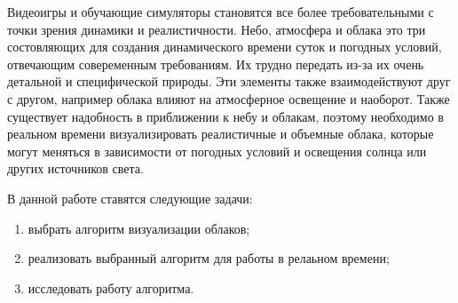 \Introduction

Видеоигры и обучающие симуляторы становятся все более требовательными с точки зрения динамики и реалистичности.
Небо, атмосфера и облака это три состовляющих для создания динамического времени суток
и погодных условий, отвечающим совеременным требованиям. Их трудно передать из-за их очень
детальной и специфической природы. Эти элементы также взаимодействуют друг с другом, например облака влияют
на атмосферное освещение и наоборот. Также существует надобность в приближении к небу и облакам,
поэтому необходимо в реальном времени визуализировать реалистичные и объемные облака, которые могут меняться
в зависимости от погодных условий и освещения солнца или других источников света.

В данной работе ставятся следующие задачи:

\begin{enumerate}
    \item выбрать алгоритм визуализации облаков;
    \item реализовать выбранный алгоритм для работы в релаьном времени;
    \item исследовать работу алгоритма.
\end{enumerate}
